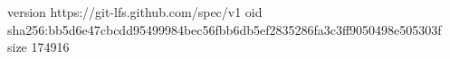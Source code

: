 version https://git-lfs.github.com/spec/v1
oid sha256:bb5d6e47cbcdd95499984bec56fbb6db5ef2835286fa3c3ff9050498e505303f
size 174916
